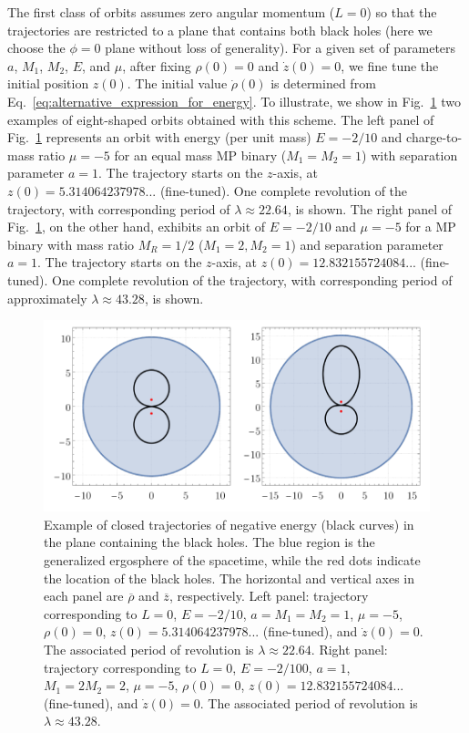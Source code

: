 The first class of orbits assumes zero angular momentum ($L=0$) so that the trajectories are restricted to a plane that contains both black holes (here we choose the $\phi=0$ plane without loss of generality). For a given set of parameters $a$, $M_1$, $M_2$, $E$, and $\mu$, after fixing $\rho(0) = 0$ and $\dot{z}(0) = 0$, we fine tune the initial position $z(0)$. The initial value $\dot{\rho} (0)$ is determined from Eq.~\eqref{eq:alternative_expression_for_energy}. To illustrate, we show in Fig.~\ref{fig:orbit_closed_bh} two examples of eight-shaped orbits obtained with this scheme. The left panel of Fig.~\ref{fig:orbit_closed_bh} represents an orbit with energy (per unit mass) $E=-2/10$ and charge-to-mass ratio $\mu=-5$ for an equal mass MP binary ($M_1=M_2=1$) with separation parameter $a=1$. The trajectory starts on the $z$-axis, at $z(0) = 5.314064237978...$ (fine-tuned). One complete revolution of the trajectory, with corresponding period of $\lambda \approx 22.64$, is shown. The right panel of Fig.~\ref{fig:orbit_closed_bh}, on the other hand, exhibits an orbit of $E=-2/10$ and $\mu=-5$ for a MP binary with mass ratio $M_R=1/2$ ($M_1=2,M_2=1$) and separation parameter $a=1$. The trajectory starts on the $z$-axis, at $z(0) = 12.832155724084...$ (fine-tuned). One complete revolution of the trajectory, with corresponding period of approximately $\lambda \approx 43.28$, is shown.

\begin{figure}[!ht]
  \centering
  \includegraphics[width=\linewidth]{img/penrose_binaries/fig4.pdf}
  \caption{Example of closed trajectories of negative energy (black curves) in the plane containing the black holes. The blue region is the generalized ergosphere of the spacetime, while the red dots indicate the location of the black holes. The horizontal and vertical axes in each panel are $\overline \rho$ and $\overline z$, respectively. Left panel: trajectory corresponding to $L=0$, $E=-2/10$, $a=M_1=M_2=1$, $\mu = -5$, $\rho(0) = 0$, $z(0) = 5.314064237978...$ (fine-tuned), and $\dot{z}(0) = 0$. The associated period of revolution is $\lambda \approx 22.64$.  Right panel: trajectory corresponding to $L=0$, $E=-2/100$, $a=1$, $M_1=2 M_2= 2$, $\mu = -5$, $\rho(0) = 0$, $z(0) = 12.832155724084...$ (fine-tuned), and $\dot{z}(0) = 0$. The associated period of revolution is $\lambda \approx 43.28$. }
  \label{fig:orbit_closed_bh}
\end{figure}

